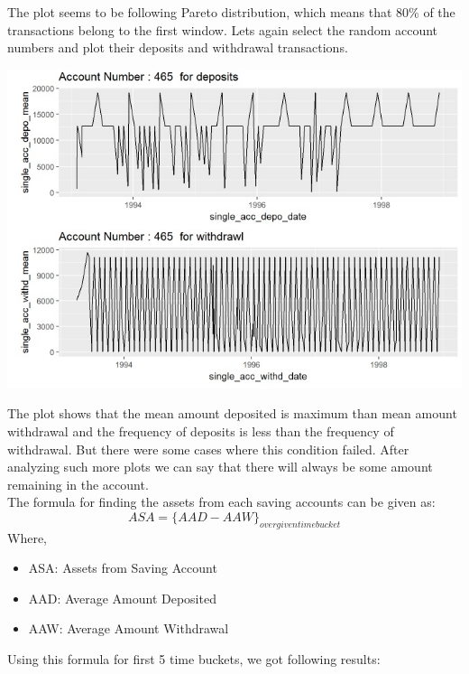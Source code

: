The plot seems to be following Pareto distribution, which means that 80\% of the transactions belong to the first window.  Lets again select the random account numbers and plot their deposits and withdrawal transactions. 
				\begin{center}
				\includegraphics[width=\linewidth]{figures/deposit-withdrawal-plot.jpg}	
				\label{fig: The deposit and withdrawal plot for randomly chosen account number}
				\end{center}
The plot shows that the mean amount deposited is maximum than mean amount withdrawal and the frequency of deposits is less than the frequency of withdrawal. But there were some cases where this condition failed. After analyzing such more plots we can say that there will always be some amount remaining in the account. \\ 
The formula for finding the assets from each saving accounts can be given as:
\begin{equation}
ASA = \{AAD - AAW\}_{over given time bucket}
\end{equation}
Where,
\begin{itemize}
\item ASA: Assets from Saving Account
\item AAD: Average Amount Deposited
\item AAW: Average Amount Withdrawal
\end{itemize}

Using this formula for first 5 time buckets, we got following results:

